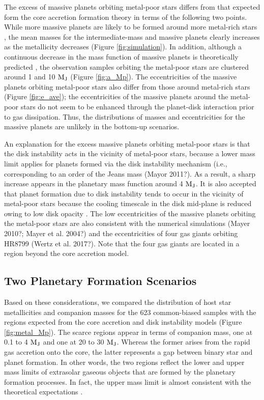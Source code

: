 \documentclass[twocolumn, dvipdfmx]{aastex62}
\begin{document}
\begin{CJK*}{UTF8}{min}
The excess of massive planets orbiting metal-poor stars differs from that expected form the core accretion formation theory in terms of the following two points. While more massive planets are likely to be formed around more metal-rich stars \citep{2012A&A...541A..97M}, the mean masses for the intermediate-mass and massive planets clearly increases as the metallicity decreases (Figure \ref{fig:simulation}). In addition, although a continuous decrease in the mass function of massive planets is theoretically predicted \citep{2009A&A...501.1161M}, the observation samples orbiting the metal-poor stars are clustered around 1 and 10 $\rm M_J$ (Figure \ref{fig:a_Mp}). The eccentricities of the massive planets orbiting metal-poor stars also differ from those around metal-rich stars (Figure \ref{fig:e_ave}); the eccentricities of the massive planets around the metal-poor stars do not seem to be enhanced through the planet-disk interaction prior to gas dissipation. Thus, the distributions of masses and eccentricities for the massive planets are unlikely in the bottom-up scenarios.

An explanation for the excess massive planets orbiting metal-poor stars is that the disk instability acts in the vicinity of metal-poor stars, because a lower mass limit applies for planets formed via the disk instability mechanism (i.e., corresponding to an order of the Jeans mass \citep{2007ApJ...662.1282M} (Mayor 2011?). As a result, a sharp increase appears in the planetary mass function around 4 $\rm M_J$. It is also accepted that planet formation due to disk instability tends to occur in the vicinity of metal-poor stars because the cooling timescale in the disk mid-plane is reduced owing to low disk opacity \citep{2006ApJ...636L.149C, 2007Arizona}. The low eccentricities of the massive planets orbiting the metal-poor stars are also consistent with the numerical simulations (Mayer 2010?; Mayer et al. 2004?) and the eccentricities of four gas giants orbiting HR8799 (Wertz et al. 2017?). Note that the four gas giants are located in a region beyond the core accretion model.


\subsection{Two Planetary Formation Scenarios} \label{subsec:scenario}

Based on these considerations, we compared the distribution of host star metallicities and companion masses for the 623 common-biased samples with the regions expected from the core accretion and disk instability models (Figure \ref{fig:metal_Mp}). The scarce regions appear in terms of companion mass, one at 0.1 to 4 $\rm M_J$ and one at 20 to 30 $\rm M_J$. Whereas the former arises from the rapid gas accretion onto the core, the latter represents a gap between binary star and planet formation. In other words, the two regions reflect the lower and upper mass limits of extrasolar gaseous objects that are formed by the planetary formation processes. In fact, the upper mass limit is almost consistent with the theoretical expectations \citep{2007ApJ...667..557T, 2012A&A...541A..97M, 2016ApJ...823...48T}.
 

\end{CJK*}
\end{document}
